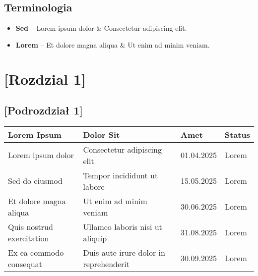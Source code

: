 \documentclass[12pt,a4paper,colorlinks=true,linkcolor=NavyBlue,citecolor=red,urlcolor=NavyBlue]{book}
\begin{document}
\section{Terminologia}
\begin{itemize}
    \item \textbf{Sed} – Lorem ipsum dolor & Consectetur adipiscing elit.
    \item \textbf{Lorem} – Et dolore magna aliqua & Ut enim ad minim veniam.
\end{itemize}

\clearpage

\chapter{[Rozdzial 1]}
\section{[Podrozdzia\l{} 1]}
\begin{center}
\begin{tabular}{|p{4cm}|p{5cm}|p{3cm}|p{2cm}|}
\hline
\textbf{Lorem Ipsum} & \textbf{Dolor Sit} & \textbf{Amet} & \textbf{Status} \\
\hline
Lorem ipsum dolor & Consectetur adipiscing elit & 01.04.2025 & Lorem \\
\hline
Sed do eiusmod & Tempor incididunt ut labore & 15.05.2025 & Lorem \\
\hline
Et dolore magna aliqua & Ut enim ad minim veniam & 30.06.2025 & Lorem \\
\hline
Quis nostrud exercitation & Ullamco laboris nisi ut aliquip & 31.08.2025 & Lorem \\
\hline
Ex ea commodo consequat & Duis aute irure dolor in reprehenderit & 30.09.2025 & Lorem \\
\hline
\end{tabular}
\end{center}
\end{document}
